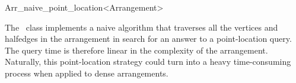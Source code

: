 
\ccRefPageBegin

\begin{ccRefClass}{Arr_naive_point_location<Arrangement>}
\label{arr_ref:naive_pl}

\ccDefinition

The \ccRefName\ class implements a naive algorithm that traverses
all the vertices and halfedges in the arrangement in search for an
answer to a point-location query.
The query time is therefore linear in the complexity of the arrangement.
Naturally, this point-location strategy could turn into a heavy
time-consuming process when applied to dense arrangements.


\ccIsModel
   \\

\end{ccRefClass}

\ccRefPageEnd
